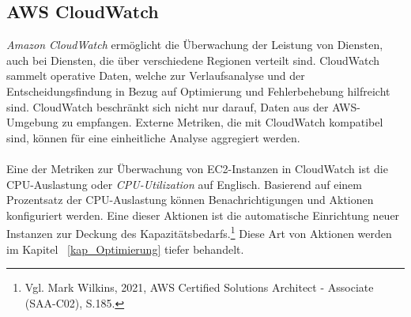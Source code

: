 \subsection{AWS CloudWatch}\label{ssec:CloudWatch}
\textit{Amazon CloudWatch} ermöglicht die Überwachung der Leistung von Diensten, auch bei Diensten, die über verschiedene Regionen verteilt sind. CloudWatch sammelt operative Daten, welche zur Verlaufsanalyse und der Entscheidungsfindung in Bezug auf Optimierung und Fehlerbehebung hilfreicht sind. CloudWatch beschränkt sich nicht nur darauf, Daten aus der AWS-Umgebung zu empfangen. Externe Metriken, die mit CloudWatch kompatibel sind, können für eine einheitliche Analyse aggregiert werden. 
\\\\
Eine der Metriken zur Überwachung von EC2-Instanzen in CloudWatch ist die CPU-Auslastung oder \textit{CPU-Utilization} auf Englisch. Basierend auf einem Prozentsatz der CPU-Auslastung können Benachrichtigungen und Aktionen konfiguriert werden. Eine dieser Aktionen ist die automatische Einrichtung neuer Instanzen zur Deckung des Kapazitätsbedarfs.\footnote{Vgl. Mark Wilkins, 2021, AWS Certified Solutions Architect - Associate (SAA-C02), S.185.\cite{AWS1}} Diese Art von Aktionen werden im Kapitel ~\ref{kap_Optimierung} tiefer behandelt.
